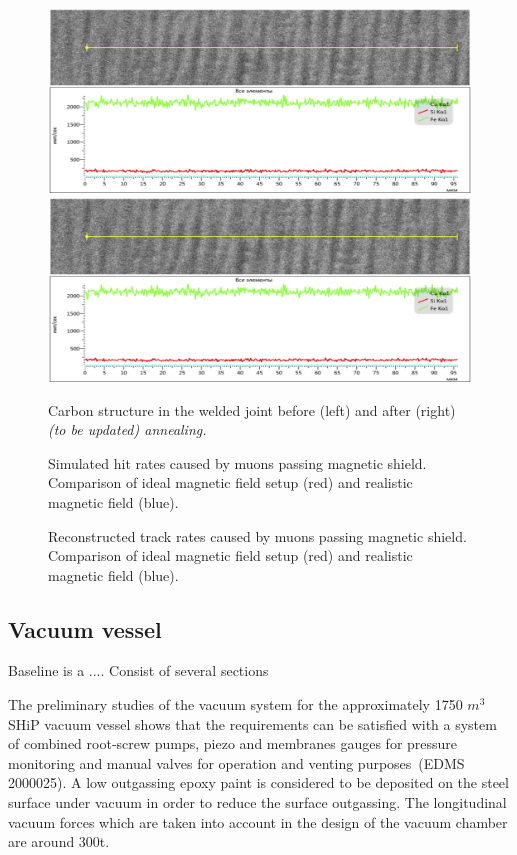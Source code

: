 \begin{figure}[thbp]
\centering
\includegraphics[width=0.45\columnwidth]{figs/BeamLine/carbon_structure.png}
\includegraphics[width=0.45\columnwidth]{figs/BeamLine/carbon_structure.png}
\caption{Carbon structure in the welded joint before (left) and after (right) \em{(to be updated)} annealing.}
\label{fig:goCarbonStructure}
\end{figure}

\begin{figure}[thbp]
\centering
\caption{Simulated hit rates caused by muons passing magnetic shield. Comparison of  ideal magnetic field setup (red) and realistic magnetic field (blue).}
\label{fig:shieldHitsMap}
\end{figure}

\begin{figure}[thbp] 
\centering
\caption{Reconstructed track rates caused by muons passing magnetic shield. Comparison of  ideal magnetic field setup (red) and realistic magnetic field (blue).}
\label{fig:shieldTracks}
\end{figure}



\subsection{Vacuum vessel}
Baseline is a ....
Consist of several sections


The preliminary studies of the vacuum system for the approximately 1750 $m^3$ SHiP vacuum vessel 
shows that the requirements can be satisfied with a system of combined root-screw pumps, piezo 
and membranes gauges for pressure monitoring and manual valves for operation and venting 
purposes~\cite{ref:vacuumsystem}(EDMS 2000025). 
A low outgassing epoxy paint is considered to be deposited on the steel surface under vacuum in 
order to reduce the surface outgassing. The longitudinal vacuum forces which are taken into 
account in the design of the vacuum chamber are around 300t. 



